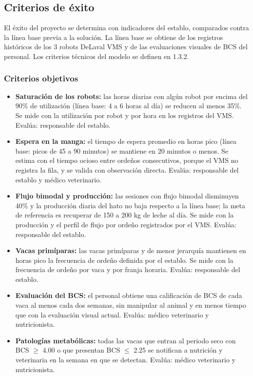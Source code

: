 \subsection{Criterios de éxito}

El éxito del proyecto se determina con indicadores del establo, comparados contra la línea base previa a la solución. La línea base se obtiene de los registros históricos de los 3 robots DeLaval VMS y de las evaluaciones visuales de BCS del personal. Los criterios técnicos del modelo se definen en 1.3.2.

\subsubsection{Criterios objetivos}

\begin{itemize}
  \item \textbf{Saturación de los robots:} las horas diarias con algún robot por encima del 90\% de utilización (línea base: 4 a 6 horas al día) se reducen al menos 35\%. Se mide con la utilización por robot y por hora en los registros del VMS. Evalúa: responsable del establo.
  \item \textbf{Espera en la manga:} el tiempo de espera promedio en horas pico (línea base: picos de 45 a 90 minutos) se mantiene en 20 minutos o menos. Se estima con el tiempo ocioso entre ordeños consecutivos, porque el VMS no registra la fila, y se valida con observación directa. Evalúa: responsable del establo y médico veterinario.
  \item \textbf{Flujo bimodal y producción:} las sesiones con flujo bimodal disminuyen 40\% y la producción diaria del hato no baja respecto a la línea base; la meta de referencia es recuperar de 150 a 200 kg de leche al día. Se mide con la producción y el perfil de flujo por ordeño registrados por el VMS. Evalúa: responsable del establo.
  \item \textbf{Vacas primíparas:} las vacas primíparas y de menor jerarquía mantienen en horas pico la frecuencia de ordeño definida por el establo. Se mide con la frecuencia de ordeño por vaca y por franja horaria. Evalúa: responsable del establo.
  \item \textbf{Evaluación del BCS:} el personal obtiene una calificación de BCS de cada vaca al menos cada dos semanas, sin manipular al animal y en menos tiempo que con la evaluación visual actual. Evalúa: médico veterinario y nutricionista.
  \item \textbf{Patologías metabólicas:} todas las vacas que entran al periodo seco con BCS $\geq$ 4.00 o que presentan BCS $\leq$ 2.25 se notifican a nutrición y veterinaria en la semana en que se detectan. Evalúa: médico veterinario y nutricionista.

\end{itemize}
